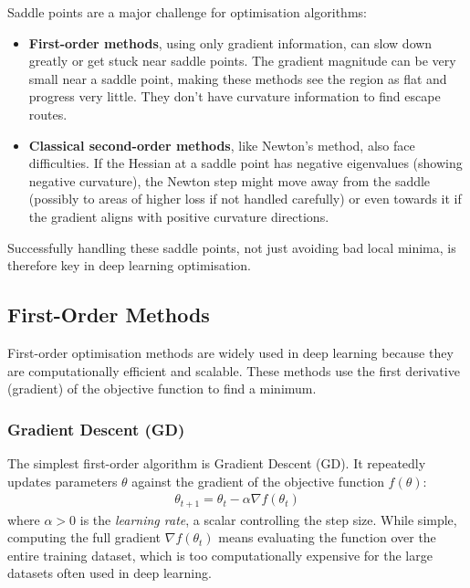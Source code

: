 Saddle points are a major challenge for optimisation algorithms:
\begin{itemize}
    \item \textbf{First-order methods}, using only gradient information, can slow down greatly or get stuck near saddle points. The gradient magnitude can be very small near a saddle point, making these methods see the region as flat and progress very little. They don't have curvature information to find escape routes.
    \item \textbf{Classical second-order methods}, like Newton's method, also face difficulties. If the Hessian at a saddle point has negative eigenvalues (showing negative curvature), the Newton step might move away from the saddle (possibly to areas of higher loss if not handled carefully) or even towards it if the gradient aligns with positive curvature directions.
\end{itemize}
Successfully handling these saddle points, not just avoiding bad local minima, is therefore key in deep learning optimisation.

\subsection{First-Order Methods}
\label{ssec:first_order_methods}

First-order optimisation methods are widely used in deep learning because they are computationally efficient and scalable. These methods use the first derivative (gradient) of the objective function to find a minimum.

\subsubsection{Gradient Descent (GD)}
The simplest first-order algorithm is Gradient Descent (GD). It repeatedly updates parameters $\theta$ against the gradient of the objective function $f(\theta)$:
\begin{align}
    \theta_{t+1} = \theta_t - \alpha \nabla f(\theta_t)
    \label{eq:gd_update}
\end{align}
where $\alpha > 0$ is the \textit{learning rate}, a scalar controlling the step size. While simple, computing the full gradient $\nabla f(\theta_t)$ means evaluating the function over the entire training dataset, which is too computationally expensive for the large datasets often used in deep learning.

